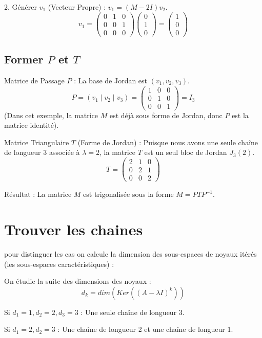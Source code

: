 \documentclass[french]{yLectureNote}
\begin{document}
2.  Générer $v_1$ (Vecteur Propre) : $v_1 = (M - 2I) v_2$.
    $$v_1 = \begin{pmatrix} 0 & 1 & 0 \\ 0 & 0 & 1 \\ 0 & 0 & 0 \end{pmatrix} \begin{pmatrix} 0 \\ 1 \\ 0 \end{pmatrix} = \begin{pmatrix} 1 \\ 0 \\ 0 \end{pmatrix}$$

\subsection{Former $P$ et $T$}

Matrice de Passage $P$ : La base de Jordan est $(v_1, v_2, v_3)$.
    $$P = (v_1 \mid v_2 \mid v_3) = \begin{pmatrix} 1 & 0 & 0 \\ 0 & 1 & 0 \\ 0 & 0 & 1 \end{pmatrix} = I_3$$
    (Dans cet exemple, la matrice $M$ est déjà sous forme de Jordan, donc $P$ est la matrice identité).

Matrice Triangulaire $T$ (Forme de Jordan) :
    Puisque nous avons une seule chaîne de longueur 3 associée à $\lambda=2$, la matrice $T$ est un seul bloc de Jordan $J_3(2)$.
    $$T = \begin{pmatrix} 2 & 1 & 0 \\ 0 & 2 & 1 \\ 0 & 0 & 2 \end{pmatrix}$$


Résultat : La matrice $M$ est trigonalisée sous la forme $M = P T P^{-1}$.
\section{Trouver les chaines}
pour distinguer les cas on calcule la dimension des sous-espaces de noyaux itérés (les sous-espaces caractéristiques) :

On étudie la suite des dimensions des noyaux :
\[d_k​=dim(Ker((A−\lambda I)^k))\]

Si \(d_1​=1, d_2​=2, d_3​=3\) : Une seule chaîne de longueur 3.

Si \(d_1​=2, d_2​=3\) : Une chaîne de longueur 2 et une chaîne de longueur 1.
\end{document}

